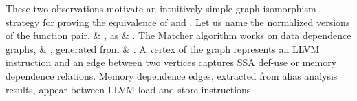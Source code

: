 %


These two observations motivate an intuitively simple graph isomorphism strategy for
proving the equivalence of \T and \Tp.
%
Let us name the normalized versions of the function pair, \F \& \FP, as \FN \& 
\FNP.
The Matcher algorithm works on data dependence graphs, \GN \& \GNP, generated  
from \FN \& \FNP. A vertex of the graph represents an 
LLVM instruction and an edge between two vertices captures SSA def-use  or   
memory 
dependence relations. Memory dependence edges, extracted from alias analysis 
results, appear between LLVM load and 
store instructions.

